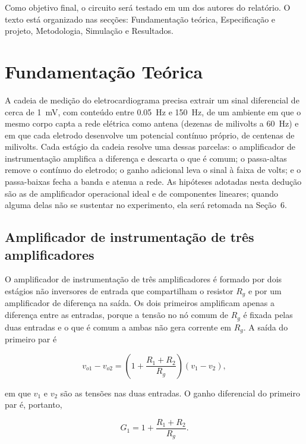 \documentclass[11pt,a4paper]{article}
\begin{document}
Como objetivo final, o circuito será testado em um dos autores do relatório.
O texto está organizado nas secções: Fundamentação teórica, Especificação e projeto, Metodologia, Simulação e Resultados.

\section{Fundamentação Teórica}

A cadeia de medição do eletrocardiograma precisa extrair um sinal diferencial de cerca de \SI{1}{\milli\volt}, com conteúdo entre \SI{0,05}{\hertz} e \SI{150}{\hertz}, de um ambiente em que o mesmo corpo capta a rede elétrica como antena (dezenas de milivolts a \SI{60}{\hertz}) e em que cada eletrodo desenvolve um potencial contínuo próprio, de centenas de milivolts. Cada estágio da cadeia resolve uma dessas parcelas: o amplificador de instrumentação amplifica a diferença e descarta o que é comum; o passa-altas remove o contínuo do eletrodo; o ganho adicional leva o sinal à faixa de volts; e o passa-baixas fecha a banda e atenua a rede. As hipóteses adotadas nesta dedução são as de amplificador operacional ideal e de componentes lineares; quando alguma delas não se sustentar no experimento, ela será retomada na Seção~6.

\subsection{Amplificador de instrumentação de três amplificadores}

O amplificador de instrumentação de três amplificadores é formado por dois estágios não inversores de entrada que compartilham o resistor $R_g$ e por um amplificador de diferença na saída. Os dois primeiros amplificam apenas a diferença entre as entradas, porque a tensão no nó comum de $R_g$ é fixada pelas duas entradas e o que é comum a ambas não gera corrente em $R_g$. A saída do primeiro par é

\begin{equation}
v_{o1} - v_{o2} = \left( 1 + \frac{R_1 + R_2}{R_g} \right) (v_1 - v_2) ,
\label{eq:inamp_ganho}
\end{equation}

em que $v_1$ e $v_2$ são as tensões nas duas entradas. O ganho diferencial do primeiro par é, portanto,

\begin{equation}
G_1 = 1 + \frac{R_1 + R_2}{R_g} .
\label{eq:g1}
\end{equation}
\end{document}
